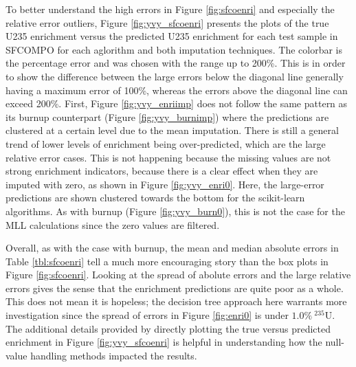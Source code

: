 To better understand the high errors in Figure \ref{fig:sfcoenri} and
especially the relative error outliers, Figure \ref{fig:yvy_sfcoenri} presents
the plots of the true \gls{U235} enrichment versus the predicted \gls{U235}
enrichment for each test sample in \gls{SFCOMPO} for each aglorithm and both
imputation techniques.  The colorbar is the percentage error and was chosen
with the range up to 200\%.  This is in order to show the difference between
the large errors below the diagonal line generally having a maximum error of
100\%, whereas the errors above the diagonal line can exceed 200\%.  First,
Figure \ref{fig:yvy_enriimp} does not follow the same pattern as its burnup
counterpart (Figure \ref{fig:yvy_burnimp}) where the predictions are clustered
at a certain level due to the mean imputation.  There is still a general trend
of lower levels of enrichment being over-predicted, which are the large
relative error cases.  This is not happening because the missing values are not
strong enrichment indicators, because there is a clear effect when they are
imputed with zero, as shown in Figure \ref{fig:yvy_enri0}.  Here, the
large-error predictions are shown clustered towards the bottom for the
scikit-learn algorithms.  As with burnup (Figure \ref{fig:yvy_burn0}), this is
not the case for the \gls{MLL} calculations since the zero values are filtered. 

Overall, as with the case with burnup, the mean and median absolute errors in
Table \ref{tbl:sfcoenri} tell a much more encouraging story than the box plots
in Figure \ref{fig:sfcoenri}.  Looking at the spread of abolute errors and the
large relative errors gives the sense that the enrichment predictions are quite
poor as a whole. This does not mean it is hopeless; the decision tree approach
here warrants more investigation since the spread of errors in Figure
\ref{fig:enri0} is under $1.0\%\:{}^{235}\text{U}$. The additional details
provided by directly plotting the true versus predicted enrichment in Figure
\ref{fig:yvy_sfcoenri} is helpful in understanding how the null-value handling
methods impacted the results.

